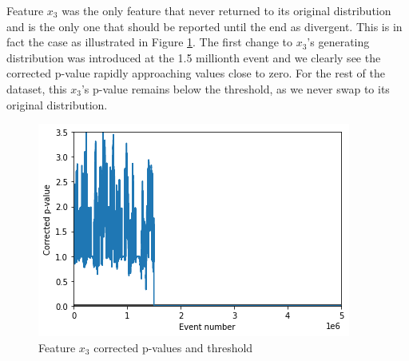 \documentclass[sigconf]{acmart}
\begin{document}
Feature $x_3$ was the only feature that never returned to its original distribution and is the only one that should be reported until the end as divergent. This is in fact the case as illustrated in Figure \ref{fig:x3-corrected-pvalues}. The first change to $x_3$'s generating distribution was introduced at the 1.5 millionth event and we clearly see the corrected p-value rapidly approaching values close to zero. For the rest of the dataset, this $x_3$'s p-value remains below the threshold, as we never swap to its original distribution.
\begin{figure}[!htb]
    \begin{center}
      \includegraphics[scale=0.5]{figures/x3-corrected-pvalues.png}
      \caption{Feature $x_3$ corrected p-values and threshold}
      \label{fig:x3-corrected-pvalues}
    \end{center}
\end{figure}
\end{document}
